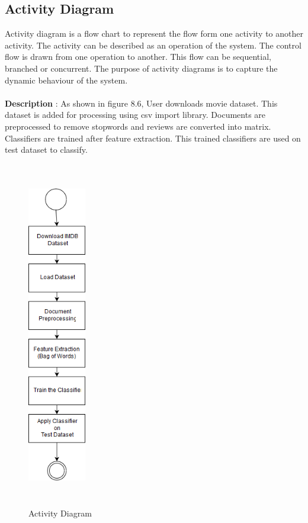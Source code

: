 \documentclass[oneside,a4paper,12pt]{pictreport}
\begin{document}
\subsection{Activity Diagram}
Activity diagram is a flow chart to represent the flow form one activity to another activity. The activity can be described as an operation of the system. The control flow is drawn from one operation to another. This flow can be sequential, branched or concurrent. The purpose of activity diagrams is to capture the dynamic behaviour of the system.\\\\
\textbf{Description} : As shown in figure 8.6, User downloads movie dataset. This dataset is added for processing using csv import 
library. Documents are preprocessed to remove stopwords and reviews are converted into matrix. Classifiers are trained after feature extraction. This trained classifiers are used on test dataset to classify.
\begin{figure}[h!]
\begin{center}
 

\includegraphics[width=1.0in,height=6.0in]{Activity.png}
\caption{Activity Diagram}
\end{center}

\end{figure}
\newpage
\end{document}

